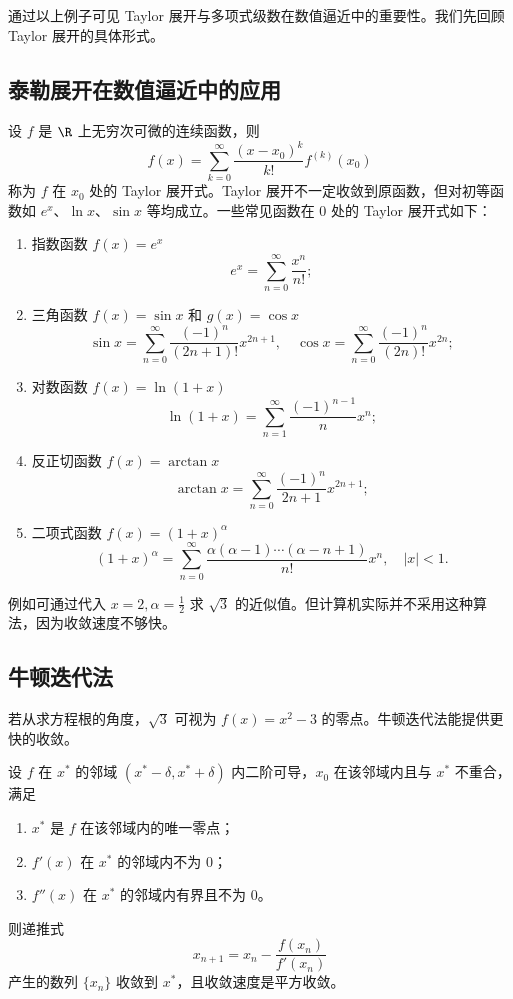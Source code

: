 通过以上例子可见 Taylor 展开与多项式级数在数值逼近中的重要性。我们先回顾 Taylor 展开的具体形式。

\subsection{泰勒展开在数值逼近中的应用}
设 $f$ 是 $\R$ 上无穷次可微的连续函数，则
\[
f(x) = \sum_{k=0}^{\infty} \frac{(x-x_0)^k}{k!} f^{(k)}(x_0)
\]
称为 $f$ 在 $x_0$ 处的 Taylor 展开式。Taylor 展开不一定收敛到原函数，但对初等函数如 $e^x$、$\ln x$、$\sin x$ 等均成立。一些常见函数在 $0$ 处的 Taylor 展开式如下：
\begin{enumerate}
    \item 指数函数 $f(x) = e^x$
    \[ e^x = \sum_{n=0}^{\infty}\frac{x^n}{n!}; \]
    \item 三角函数 $f(x) = \sin x$ 和 $g(x) = \cos x$
    \[
    \sin x =\sum_{n=0}^{\infty} \frac{(-1)^n}{(2n+1)!}x^{2n+1},\quad
    \cos x = \sum_{n=0}^{\infty} \frac{(-1)^n}{(2n)!}x^{2n};
    \]
    \item 对数函数 $f(x) = \ln (1+x)$
    \[ \ln (1+x) = \sum_{n=1}^{\infty} \frac{(-1)^{n-1}}{n} x^n; \]
    \item 反正切函数 $f(x) = \arctan x$
    \[ \arctan x = \sum_{n=0}^{\infty} \frac{(-1)^n}{2n+1} x^{2n+1}; \]
    \item 二项式函数 $f(x) = (1+x)^\alpha$
    \[ (1+x)^\alpha = \sum_{n=0}^{\infty} \frac{\alpha(\alpha-1)\cdots(\alpha-n+1)}{n!} x^n,\quad |x|<1. \]
\end{enumerate}

例如可通过代入 $x=2,\alpha=\frac12$ 求 $\sqrt{3}$ 的近似值。但计算机实际并不采用这种算法，因为收敛速度不够快。

\subsection{牛顿迭代法}
若从求方程根的角度，$\sqrt{3}$ 可视为 $f(x)=x^2-3$ 的零点。牛顿迭代法能提供更快的收敛。

\begin{theorem}
设 $f$ 在 $x^*$ 的邻域 $(x^*-\delta, x^*+\delta)$ 内二阶可导，$x_0$ 在该邻域内且与 $x^*$ 不重合，满足
\begin{enumerate}
    \item $x^*$ 是 $f$ 在该邻域内的唯一零点；
    \item $f'(x)$ 在 $x^*$ 的邻域内不为 $0$；
    \item $f''(x)$ 在 $x^*$ 的邻域内有界且不为 $0$。
\end{enumerate}
则递推式
\[ x_{n+1} = x_n - \frac{f(x_n)}{f'(x_n)} \]
产生的数列 $\{x_n\}$ 收敛到 $x^*$，且收敛速度是平方收敛。
\end{theorem}

